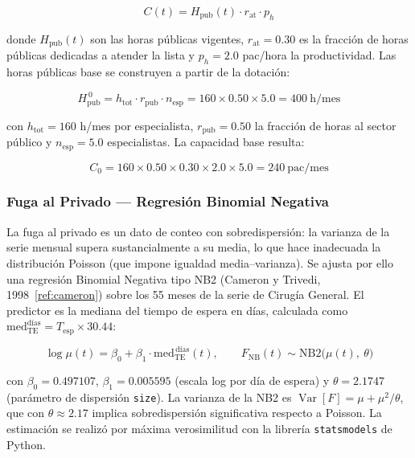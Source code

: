 \documentclass[12pt,a4paper]{article}
\begin{document}
\begin{equation}
  C(t) = H_{\text{pub}}(t)\cdot r_{\text{at}}\cdot p_h
  \label{eq:capacidad}
\end{equation}

donde $H_{\text{pub}}(t)$ son las horas públicas vigentes, $r_{\text{at}}=0.30$ es la fracción de horas públicas dedicadas a atender la lista y $p_h=2.0$ pac/hora la productividad. Las horas públicas base se construyen a partir de la dotación:

\begin{equation}
  H_{\text{pub}}^{\,0} = h_{\text{tot}}\cdot r_{\text{pub}}\cdot n_{\text{esp}}
  = 160 \times 0.50 \times 5.0 = 400 \ \text{h/mes}
\end{equation}

con $h_{\text{tot}}=160$ h/mes por especialista, $r_{\text{pub}}=0.50$ la fracción de horas al sector público y $n_{\text{esp}}=5.0$ especialistas. La capacidad base resulta:

\begin{equation}
  C_0 = 160 \times 0.50 \times 0.30 \times 2.0 \times 5.0 = 240 \ \text{pac/mes}
\end{equation}

\subsubsection*{Fuga al Privado — Regresión Binomial Negativa}

La fuga al privado es un dato de conteo con sobredispersión: la varianza de la serie mensual supera sustancialmente a su media, lo que hace inadecuada la distribución Poisson (que impone igualdad media--varianza). Se ajusta por ello una regresión Binomial Negativa tipo NB2 (Cameron y Trivedi, 1998~\ref{ref:cameron}) sobre los 55 meses de la serie de Cirugía General. El predictor es la mediana del tiempo de espera en días, calculada como $\text{med}_{\text{TE}}^{\text{días}} = T_{\text{esp}} \times 30.44$:

\begin{equation}
  \log \mu(t) = \beta_0 + \beta_1 \cdot \text{med}_{\text{TE}}^{\,\text{días}}(t),
  \qquad
  F_{\text{NB}}(t) \sim \text{NB2}\bigl(\mu(t),\ \theta\bigr)
  \label{eq:nb}
\end{equation}

con $\beta_0 = 0.497107$, $\beta_1 = 0.005595$ (escala log por día de espera) y $\theta = 2.1747$ (parámetro de dispersión \texttt{size}). La varianza de la NB2 es $\operatorname{Var}[F] = \mu + \mu^2/\theta$, que con $\theta \approx 2.17$ implica sobredispersión significativa respecto a Poisson. La estimación se realizó por máxima verosimilitud con la librería \texttt{statsmodels} de Python.
\end{document}
